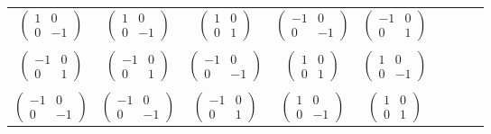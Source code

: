 \begin{multicols}{2}
\begin{table}[H]
{\begin{center}
\begin{tabular}{c|cccccccc}
\\
$\begin{pmatrix}1 & 0 \\0 & -1\end{pmatrix}$       
& $\begin{pmatrix}1 & 0 \\0 & -1\end{pmatrix}$ 
& $\begin{pmatrix}1 & 0 \\ 0 & 1 \end{pmatrix}$ 
& $\begin{pmatrix}-1 & 0 \\0 & -1\end{pmatrix}$ 
& $\begin{pmatrix}-1 & 0 \\0 & 1\end{pmatrix}$ \\
\\
$\begin{pmatrix}-1 & 0 \\0 & 1\end{pmatrix}$       
& $\begin{pmatrix}-1 & 0 \\0 & 1\end{pmatrix}$ 
& $\begin{pmatrix}-1 & 0 \\0 & -1\end{pmatrix}$ 
& $\begin{pmatrix}1 & 0 \\ 0 & 1 \end{pmatrix}$ 
& $\begin{pmatrix}1 & 0 \\0 & -1\end{pmatrix}$ \\
\\
$\begin{pmatrix}-1 & 0 \\0 & -1\end{pmatrix}$       
& $\begin{pmatrix}-1 & 0 \\0 & -1\end{pmatrix}$ 
& $\begin{pmatrix}-1 & 0 \\0 & 1\end{pmatrix}$ 
& $\begin{pmatrix}1 & 0 \\0 & -1\end{pmatrix}$ 
& $\begin{pmatrix}1 & 0 \\ 0 & 1 \end{pmatrix}$ \\
\end{tabular}
\end{center}
}
\end{table}
\end{multicols}
